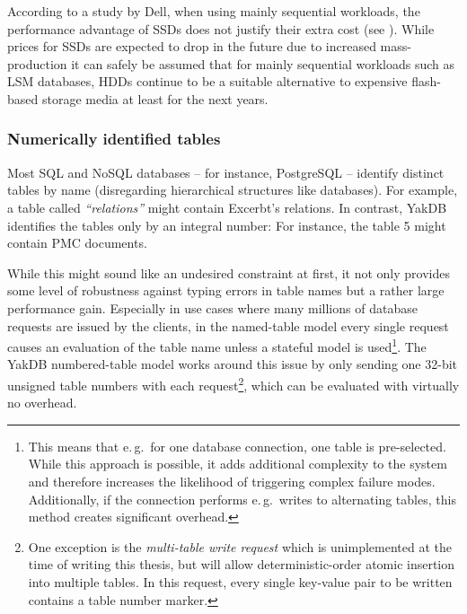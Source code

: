 \documentclass[a4paper, 12pt, twoside, reqn]{report}
\numberwithin{figure}{chapter}
\newtheorem[L]{boxedDefinition}{Definition}
\newtheorem[L]{boxedExample}{Example}
\newcommand{\eg}{e.\,g.\ }
\newcommand{\itquote}[1]{\textit{{``}#1{''}}}
\begin{document}
According to a study by Dell, when using mainly sequential workloads, the performance advantage of SSDs does not justify their extra cost (see \cite{dellssdhdd}). While prices for SSDs are expected to drop in the future due to increased mass-production it can safely be assumed that for mainly sequential workloads such as LSM databases, HDDs continue to be a suitable alternative to expensive flash-based storage media at least for the next years.

\subsubsection{Numerically identified tables}
Most SQL and NoSQL databases -- for instance, PostgreSQL -- identify distinct tables by name (disregarding hierarchical structures like databases). For example, a table called \itquote{relations} might contain Excerbt's relations. In contrast, YakDB identifies the tables only by an integral number: For instance, the table 5 might contain PMC documents.

While this might sound like an undesired constraint at first, it not only provides some level of robustness against typing errors in table names but a rather large performance gain. Especially in use cases where many millions of database requests are issued by the clients, in the named-table model every single request causes an evaluation of the table name unless a stateful model is used\footnote{This means that \eg for one database connection, one table is pre-selected. While this approach is possible, it adds additional complexity to the system and therefore increases the likelihood of triggering complex failure modes. Additionally, if the connection performs \eg writes to alternating tables, this method creates significant overhead.}. The YakDB numbered-table model works around this issue by only sending one 32-bit unsigned table numbers with each request\footnote{One exception is the \textit{multi-table write request} which is unimplemented at the time of writing this thesis, but will allow deterministic-order atomic insertion into multiple tables. In this request, every single key-value pair to be written contains a table number marker.}, which can be evaluated with virtually no overhead.
 
\end{document}
